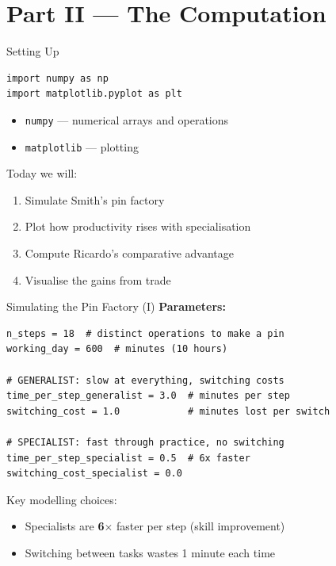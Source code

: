 \documentclass[aspectratio=169, 10pt]{beamer}
\begin{document}
\section{Part II --- The Computation}

\begin{frame}[fragile]{Setting Up}
\begin{lstlisting}
import numpy as np
import matplotlib.pyplot as plt
\end{lstlisting}
\vspace{0.5em}
\begin{itemize}
  \item \texttt{numpy} --- numerical arrays and operations
  \item \texttt{matplotlib} --- plotting
\end{itemize}
\vspace{0.5em}
Today we will:
\begin{enumerate}
  \item Simulate Smith's pin factory
  \item Plot how productivity rises with specialisation
  \item Compute Ricardo's comparative advantage
  \item Visualise the gains from trade
\end{enumerate}
\end{frame}

\begin{frame}[fragile]{Simulating the Pin Factory (I)}
\textbf{Parameters:}
\begin{lstlisting}
n_steps = 18  # distinct operations to make a pin
working_day = 600  # minutes (10 hours)

# GENERALIST: slow at everything, switching costs
time_per_step_generalist = 3.0  # minutes per step
switching_cost = 1.0            # minutes lost per switch

# SPECIALIST: fast through practice, no switching
time_per_step_specialist = 0.5  # 6x faster
switching_cost_specialist = 0.0
\end{lstlisting}
\vspace{0.3em}
Key modelling choices:
\begin{itemize}
  \item Specialists are \textbf{6$\times$} faster per step (skill improvement)
  \item Switching between tasks wastes 1 minute each time
\end{itemize}
\end{frame}
\end{document}
